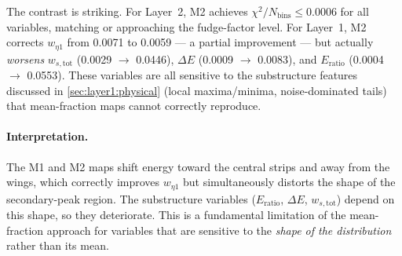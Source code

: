 \documentclass[11pt,a4paper]{article}
\newcommand{\wetaone}{w_{\eta 1}}
\newcommand{\wstot}{w_{s,\mathrm{tot}}}
\newcommand{\dE}{\Delta E}
\newcommand{\Eratio}{E_{\mathrm{ratio}}}
\newcommand{\chisq}{\chi^2/N_\mathrm{bins}}
\begin{document}
The contrast is striking.  For Layer~2, M2 achieves $\chisq \le 0.0006$
for all variables, matching or approaching the fudge-factor level.
For Layer~1, M2 corrects $\wetaone$ from 0.0071 to 0.0059 — a
partial improvement — but actually \emph{worsens} $\wstot$
(0.0029 $\to$ 0.0446), $\dE$ (0.0009 $\to$ 0.0083), and
$\Eratio$ (0.0004 $\to$ 0.0553).  These variables are all sensitive
to the substructure features discussed in \cref{sec:layer1:physical}
(local maxima/minima, noise-dominated tails) that mean-fraction maps
cannot correctly reproduce.

\paragraph{Interpretation.}
The M1 and M2 maps shift energy toward the central strips and away
from the wings, which correctly improves $\wetaone$ but simultaneously
distorts the shape of the secondary-peak region.  The substructure
variables ($\Eratio$, $\dE$, $\wstot$) depend on this shape, so they
deteriorate.  This is a fundamental limitation of the mean-fraction
approach for variables that are sensitive to the \emph{shape of the
distribution} rather than its mean.
\end{document}
